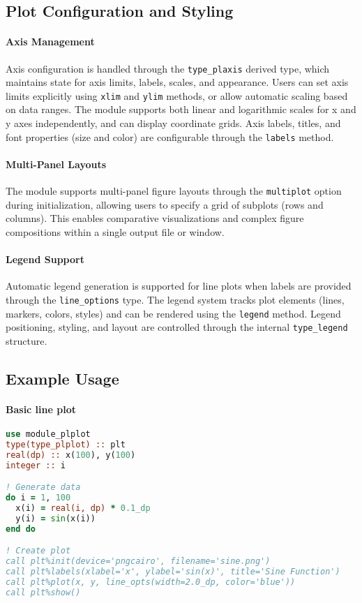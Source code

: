 \documentclass[12pt,a4paper]{report}
\begin{document}
\subsection{Plot Configuration and Styling}

\paragraph{Axis Management}
Axis configuration is handled through the \texttt{type\_plaxis} derived type, which maintains state for axis limits, labels, scales, and appearance. Users can set axis limits explicitly using \texttt{xlim} and \texttt{ylim} methods, or allow automatic scaling based on data ranges. The module supports both linear and logarithmic scales for x and y axes independently, and can display coordinate grids. Axis labels, titles, and font properties (size and color) are configurable through the \texttt{labels} method.

\paragraph{Multi-Panel Layouts}
The module supports multi-panel figure layouts through the \texttt{multiplot} option during initialization, allowing users to specify a grid of subplots (rows and columns). This enables comparative visualizations and complex figure compositions within a single output file or window.

\paragraph{Legend Support}
Automatic legend generation is supported for line plots when labels are provided through the \texttt{line\_options} type. The legend system tracks plot elements (lines, markers, colors, styles) and can be rendered using the \texttt{legend} method. Legend positioning, styling, and layout are controlled through the internal \texttt{type\_legend} structure.

\subsection{Example Usage}

\paragraph{Basic line plot}
\begin{lstlisting}[language=Fortran]
use module_plplot
type(type_plplot) :: plt
real(dp) :: x(100), y(100)
integer :: i

! Generate data
do i = 1, 100
  x(i) = real(i, dp) * 0.1_dp
  y(i) = sin(x(i))
end do

! Create plot
call plt%init(device='pngcairo', filename='sine.png')
call plt%labels(xlabel='x', ylabel='sin(x)', title='Sine Function')
call plt%plot(x, y, line_opts(width=2.0_dp, color='blue'))
call plt%show()
\end{lstlisting}
\end{document}
